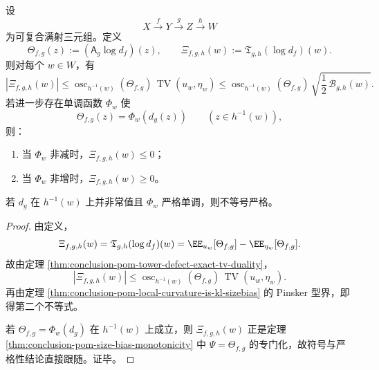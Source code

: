 \begin{theorem}[三阶余圈的符号与曲率包络]\label{thm:conclusion-pom-third-obstruction-curvature-envelope}
设
\[
X\xrightarrow{f}Y\xrightarrow{g}Z\xrightarrow{h}W
\]
为可复合满射三元组。定义
\[
\Theta_{f,g}(z):=(\mathsf A_g\log d_f)(z),
\qquad
\Xi_{f,g,h}(w):=\mathfrak T_{g,h}(\log d_f)(w).
\]
则对每个 \(w\in W\)，有
\[
|\Xi_{f,g,h}(w)|
\le
\operatorname{osc}_{h^{-1}(w)}(\Theta_{f,g})\,
\operatorname{TV}(u_w,\eta_w)
\le
\operatorname{osc}_{h^{-1}(w)}(\Theta_{f,g})\,
\sqrt{\frac12\,\mathcal B_{g,h}(w)}.
\]
若进一步存在单调函数 \(\Phi_w\) 使
\[
\Theta_{f,g}(z)=\Phi_w(d_g(z))
\qquad (z\in h^{-1}(w)),
\]
则：
\begin{enumerate}
  \item 当 \(\Phi_w\) 非减时，\(\Xi_{f,g,h}(w)\le 0\)；
  \item 当 \(\Phi_w\) 非增时，\(\Xi_{f,g,h}(w)\ge 0\)。
\end{enumerate}
若 \(d_g\) 在 \(h^{-1}(w)\) 上并非常值且 \(\Phi_w\) 严格单调，则不等号严格。
\end{theorem}
\begin{proof}
由定义，
\[
\Xi_{f,g,h}(w)=\mathfrak T_{g,h}(\log d_f)(w)=\EE_{u_w}[\Theta_{f,g}]-\EE_{\eta_w}[\Theta_{f,g}].
\]
故由定理 \ref{thm:conclusion-pom-tower-defect-exact-tv-duality}，
\[
|\Xi_{f,g,h}(w)|
\le
\operatorname{osc}_{h^{-1}(w)}(\Theta_{f,g})\,
\operatorname{TV}(u_w,\eta_w).
\]
再由定理 \ref{thm:conclusion-pom-local-curvature-is-kl-sizebias} 的 Pinsker 型界，即得第二个不等式。

若 \(\Theta_{f,g}=\Phi_w(d_g)\) 在 \(h^{-1}(w)\) 上成立，则 \(\Xi_{f,g,h}(w)\) 正是定理 \ref{thm:conclusion-pom-size-bias-monotonicity} 中 \(\Psi=\Theta_{f,g}\) 的专门化，故符号与严格性结论直接跟随。证毕。
\end{proof}

